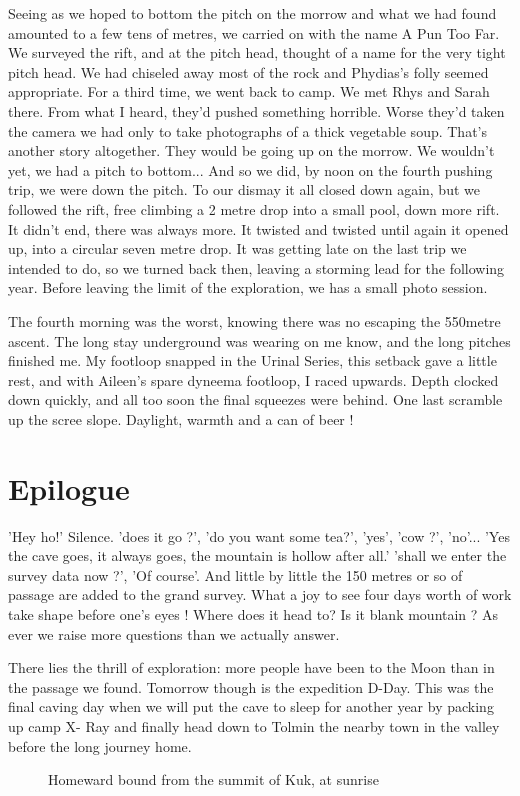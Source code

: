 Seeing as we hoped to bottom the pitch on the morrow and what we had found amounted to a few tens of metres, we carried on with the name A Pun Too Far. We surveyed the rift, and at the pitch head, thought of a name for the very tight pitch head. We had chiseled away most of the rock and Phydias's folly seemed appropriate.
For a third time, we went back to camp. We met Rhys and Sarah there. From what I heard, they'd pushed something horrible. Worse they'd taken the camera we had only to take photographs of a thick vegetable soup. That's another story altogether. They would be going up on the morrow. We wouldn't yet, we had a pitch to bottom...
And so we did, by noon on the fourth pushing trip, we were down the pitch. To our dismay it all closed down again, but we followed the rift, free climbing a 2 metre drop into a small pool, down more rift. It didn't end, there was always more. It twisted and twisted until again it opened up, into a circular seven metre drop. It was getting late on the last trip we intended to do, so we turned back then, leaving a storming lead for the following year. Before leaving the limit of the exploration, we has a small photo session.

The fourth morning was the worst, knowing there was no escaping the 550metre ascent. The long stay underground was wearing on me know, and the long pitches finished me. My footloop snapped in the Urinal Series, this setback gave a little rest, and with Aileen's spare dyneema footloop, I raced upwards. Depth clocked down quickly, and all too soon the final squeezes were behind. One last scramble up the scree slope. Daylight, warmth and a can of beer !

\section{Epilogue}
'Hey ho!' Silence. 'does it go ?', 'do you want some tea?', 'yes', 'cow ?', 'no'...
'Yes the cave goes, it always goes, the mountain is hollow after all.' 'shall we enter the survey data now ?', 'Of course'. And little by little the 150 metres or so of passage are added to the grand survey. What a joy to see four days worth of work take shape before one's eyes ! Where does it head to? Is it blank mountain ? As ever we raise more questions than we actually answer.

There lies the thrill of exploration: more people have been to the Moon than in the passage we found. Tomorrow though is the expedition D-Day. This was the final caving day when we will put the cave to sleep for another year by packing up camp X- Ray and finally head down to Tolmin the nearby town in the valley before the long journey home. 

\begin{figure}[b!]
\checkoddpage \ifoddpage \forcerectofloat \else \forceversofloat \fi
\centering
{}
\caption{Homeward bound from the summit of Kuk, at sunrise}
\label{the plateau}
\end{figure}

